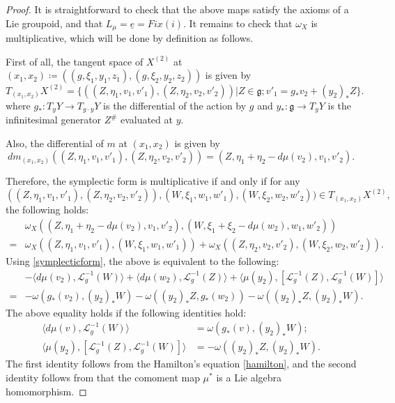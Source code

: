 \documentclass{amsart}
\numberwithin{equation}{section}
\begin{document}
\begin{proof}
It is straightforward to check that the above maps satisfy the axioms of a Lie groupoid, and that $L_\mu = \underline{e} = Fix(i)$. It remains to check that $\omega_X$ is multiplicative, which will be done by definition as follows.

    First of all, the tangent space of $X^{(2)}$ at $(x_1, x_2) \coloneqq ((g, \xi_1, y_1, z_1), (g, \xi_2, y_2, z_2))$ is given by 
    $$T_{(x_1, x_2)}X^{(2)} = \{((Z, \eta_1, v_1, v'_1), (Z, \eta_2, v_2, v'_2))| Z\in \mathfrak{g}; v'_1 = g_* v_2 + (y_2)_* Z\}.$$
    where $g_*: T_{y}Y \rightarrow T_{g\cdot y}Y$ is the differential of the action by $g$ and $y_*: \mathfrak{g} \rightarrow T_{y}Y$ is the infinitesimal generator $Z^\#$ evaluated at $y$.

    Also, the differential of $m$ at $(x_1, x_2)$ is given by
 $$dm_{(x_1, x_2)}((Z, \eta_1, v_1, v'_1), (Z, \eta_2, v_2, v'_2))=(Z, \eta_1 + \eta_2 - d\mu(v_2), v_1, v'_2).$$

    Therefore, the symplectic form is multiplicative if and only if for any 
    $$((Z, \eta_1, v_1, v'_1), (Z, \eta_2, v_2, v'_2)), (W, \xi_1, w_1, w'_1), (W, \xi_2, w_2, w'_2))\in T_{(x_1, x_2)}X^{(2)},$$
    the following holds:
\begin{align*}
    &\omega_X((Z, \eta_1 + \eta_2 - d\mu(v_2), v_1, v'_2), (W, \xi_1 + \xi_2 - d\mu(w_2), w_1, w'_2))\\
    = &\omega_X((Z, \eta_1, v_1, v'_1), (W, \xi_1, w_1, w'_1)) + \omega_X((Z, \eta_2, v_2, v'_2), (W, \xi_2, w_2, w'_2)).
\end{align*}
Using \ref{symplecticform}, the above is equivalent to the following:
\begin{align*}
&-\langle d\mu(v_2), \mathcal{L}^{-1}_{g}(W) \rangle + \langle d\mu(w_2), \mathcal{L}^{-1}_{g}(Z) \rangle + \langle \mu(y_2), [\mathcal{L}^{-1}_{g}(Z), \mathcal{L}^{-1}_{g}(W)] \rangle \\
= &-\omega(g_*(v_2), (y_2)_*W) - \omega((y_2)_*Z, g_*(w_2)) - \omega((y_2)_*Z, (y_2)_*W).
\end{align*}
The above equality holds if the following identities hold:
\begin{align*}
\langle d\mu(v), \mathcal{L}^{-1}_{g}(W) \rangle &= \omega(g_*(v), (y_2)_*W);\\
\langle \mu(y_2), [\mathcal{L}^{-1}_{g}(Z), \mathcal{L}^{-1}_{g}(W)] \rangle &= - \omega((y_2)_*Z, (y_2)_*W).
\end{align*}
The first identity follows from the Hamilton's equation \ref{hamilton}, and the second identity follows from that the comoment map $\mu^*$ is a Lie algebra homomorphism.
\end{proof}
\end{document}

